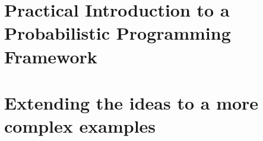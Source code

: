 \documentclass[AERbeamer%
              ,optEnglish%
              ,optBiber%
              ,optBibstyleAlphabetic%
              ,optBeamerClassicFormat%
              ]{AERlatex}%
\begin{document}
\section{Practical Introduction to a Probabilistic Programming Framework}



\section{Extending the ideas to a more complex examples}







%
%
%
%
\end{document}
